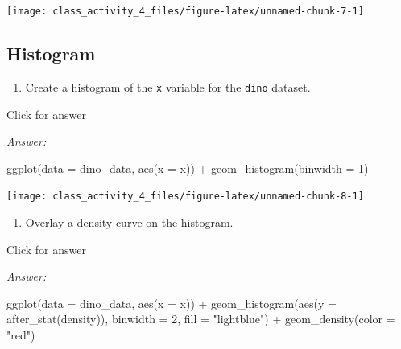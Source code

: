 \documentclass[
]{book}
\newenvironment{Shaded}{\begin{snugshade}}{\end{snugshade}}
\newcommand{\AttributeTok}[1]{\textcolor[rgb]{0.77,0.63,0.00}{#1}}
\newcommand{\DecValTok}[1]{\textcolor[rgb]{0.00,0.00,0.81}{#1}}
\newcommand{\FunctionTok}[1]{\textcolor[rgb]{0.00,0.00,0.00}{#1}}
\newcommand{\NormalTok}[1]{#1}
\newcommand{\SpecialCharTok}[1]{\textcolor[rgb]{0.00,0.00,0.00}{#1}}
\newcommand{\StringTok}[1]{\textcolor[rgb]{0.31,0.60,0.02}{#1}}
\providecommand{\tightlist}{%
  \setlength{\itemsep}{0pt}\setlength{\parskip}{0pt}}
\begin{document}
\texttt{[image: class\_activity\_4\_files/figure-latex/unnamed-chunk-7-1]}

\hypertarget{histogram}{%
\subsection{Histogram}\label{histogram}}

\begin{enumerate}
\def\labelenumi{\alph{enumi}.}
\tightlist
\item
  Create a histogram of the \texttt{x} variable for the \texttt{dino} dataset.
\end{enumerate}

Click for answer

\emph{Answer:}

\begin{Shaded}
\begin{Highlighting}[]
\FunctionTok{ggplot}\NormalTok{(}\AttributeTok{data =}\NormalTok{ dino\_data, }\FunctionTok{aes}\NormalTok{(}\AttributeTok{x =}\NormalTok{ x)) }\SpecialCharTok{+}
  \FunctionTok{geom\_histogram}\NormalTok{(}\AttributeTok{binwidth =} \DecValTok{1}\NormalTok{) }
\end{Highlighting}
\end{Shaded}

\texttt{[image: class\_activity\_4\_files/figure-latex/unnamed-chunk-8-1]}

\begin{enumerate}
\def\labelenumi{\alph{enumi}.}
\setcounter{enumi}{1}
\tightlist
\item
  Overlay a density curve on the histogram.
\end{enumerate}

Click for answer

\emph{Answer:}

\begin{Shaded}
\begin{Highlighting}[]
\FunctionTok{ggplot}\NormalTok{(}\AttributeTok{data =}\NormalTok{ dino\_data, }\FunctionTok{aes}\NormalTok{(}\AttributeTok{x =}\NormalTok{ x)) }\SpecialCharTok{+}
  \FunctionTok{geom\_histogram}\NormalTok{(}\FunctionTok{aes}\NormalTok{(}\AttributeTok{y =} \FunctionTok{after\_stat}\NormalTok{(density)), }\AttributeTok{binwidth =} \DecValTok{2}\NormalTok{, }\AttributeTok{fill =} \StringTok{"lightblue"}\NormalTok{) }\SpecialCharTok{+}
  \FunctionTok{geom\_density}\NormalTok{(}\AttributeTok{color =} \StringTok{"red"}\NormalTok{)}
\end{Highlighting}
\end{Shaded}
\end{document}
